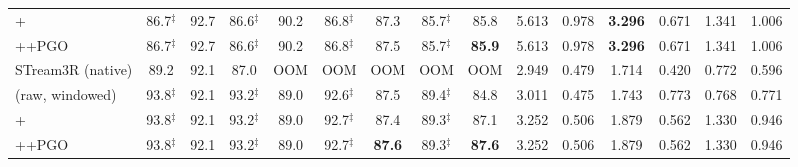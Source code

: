 \begin{table}[t]
{\begin{tabular}{@{}l cc cc cc cc ccc ccc@{}}
\;+\smr{} & 86.7$^{\ddagger}$ & 92.7 & 86.6$^{\ddagger}$ & 90.2 & 86.8$^{\ddagger}$ & 87.3 & 85.7$^{\ddagger}$ & 85.8 & 5.613 & 0.978 & \textbf{3.296} & 0.671 & 1.341 & 1.006 \\
\;+\smr{}+PGO & 86.7$^{\ddagger}$ & 92.7 & 86.6$^{\ddagger}$ & 90.2 & 86.8$^{\ddagger}$ & 87.5 & 85.7$^{\ddagger}$ & \textbf{85.9} & 5.613 & 0.978 & \textbf{3.296} & 0.671 & 1.341 & 1.006 \\
\midrule
STream3R (native) & 89.2 & 92.1 & 87.0 & OOM & OOM & OOM & OOM & OOM & 2.949 & 0.479 & 1.714 & 0.420 & 0.772 & 0.596 \\
\;(raw, windowed) & 93.8$^{\ddagger}$ & 92.1 & 93.2$^{\ddagger}$ & 89.0 & 92.6$^{\ddagger}$ & 87.5 & 89.4$^{\ddagger}$ & 84.8 & 3.011 & 0.475 & 1.743 & 0.773 & 0.768 & 0.771 \\
\;+\smr{} & 93.8$^{\ddagger}$ & 92.1 & 93.2$^{\ddagger}$ & 89.0 & 92.7$^{\ddagger}$ & 87.4 & 89.3$^{\ddagger}$ & 87.1 & 3.252 & 0.506 & 1.879 & 0.562 & 1.330 & 0.946 \\
\;+\smr{}+PGO & 93.8$^{\ddagger}$ & 92.1 & 93.2$^{\ddagger}$ & 89.0 & 92.7$^{\ddagger}$ & \textbf{87.6} & 89.3$^{\ddagger}$ & \textbf{87.6} & 3.252 & 0.506 & 1.879 & 0.562 & 1.330 & 0.946 \\
\bottomrule
\end{tabular}}
\end{table}
